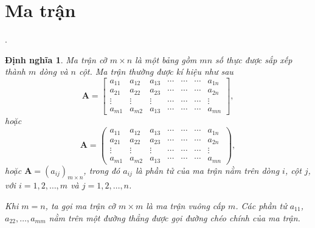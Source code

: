\documentclass[12pt,a4paper,oneside]{report}
\newtheorem{dn}{Định nghĩa}[section]
\numberwithin{equation}{section}
\begin{document}
\section{Ma trận}.
\begin{dn} \cite{hieu2019}                   
 Ma trận cỡ $m \times n$ là một bảng gồm $m n$ số thực được sắp xếp thành $m$ dòng và $n$ cột. Ma trận thường được kí hiệu như sau\\
 $$
 \mathbf{A}=\left[\begin{array}{ccccccc}
 	a_{11} & a_{12} & a_{13} & \cdots & \cdots & \cdots & a_{1 n} \\
 	a_{21} & a_{22} & a_{23} & \cdots & \cdots & \cdots & a_{2 n} \\
 	\vdots & \vdots & \vdots & \cdots & \cdots & \cdots & \vdots \\
 	a_{m 1} & a_{m 2} & a_{13} & \cdots & \cdots & \cdots & a_{m n}
 \end{array}\right],
 $$
hoặc
 $$
 \mathbf{A}=\left(\begin{array}{ccccccc}
 	a_{11} & a_{12} & a_{13} & \cdots & \cdots & \cdots & a_{1 n} \\
 	a_{21} & a_{22} & a_{23} & \cdots & \cdots & \cdots & a_{2 n} \\
 	\vdots & \vdots & \vdots & \cdots & \cdots & \cdots & \vdots \\
 	a_{m 1} & a_{m 2} & a_{13} & \cdots & \cdots & \cdots & a_{m n}
 \end{array}\right),
 $$
hoặc $\mathbf{A}=\left(a_{i j}\right)_{m \times n}$, trong đó $a_{i j}$ là phần tử của ma trận nằm trên dòng $i$, cột $j$, với $i=1,2, \ldots, m$ và $j=1,2, \ldots, n$.
 
 Khi $m=n$, ta gọi ma trận cỡ $m \times m$ là ma trận vuông cấp $m$. Các phần tử $a_{11}$, $a_{22}, \ldots, a_{m m}$ nằm trên một đường thẳng được gọi đường chéo chính của ma trận.
\end{dn}
	
\end{document}
